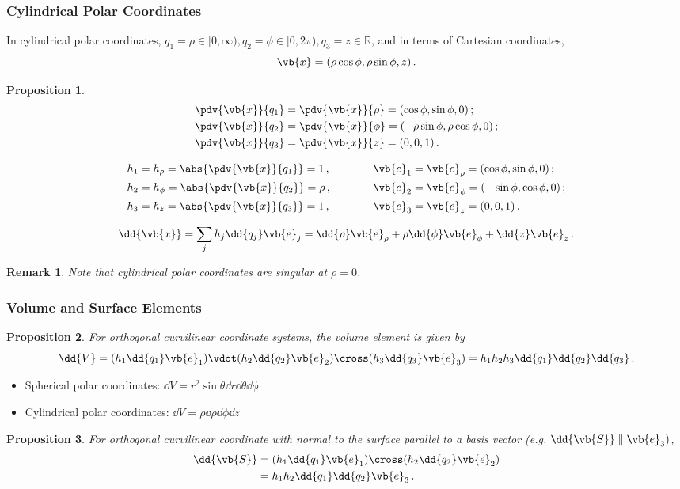 \documentclass{article}
\theoremstyle{plain}\theoremheaderfont{\normalfont\itshape}\theorembodyfont{\rmfamily}\theoremseparator{.}\newtheorem*{rem}{Remark}\newtheorem*{ex}{Example}\newtheorem*{proof}{Proof}\newtheorem*{altp}{Alternative proof}
\theoremstyle{plain}\theoremheaderfont{\normalfont\bfseries}\theorembodyfont{\rmfamily}\theoremseparator{.}\newtheorem{thm}{Theorem}[section]\newtheorem{lem}[thm]{Lemma}\newtheorem{prop}[thm]{Proposition}\newtheorem*{cor}{Corollary}\newtheorem{defn}[thm]{Definition}\newtheorem{clm}[thm]{Claim}\newtheorem{clminproof}{Claim}
\theoremstyle{break}\theoremheaderfont{\normalfont\itshape}\theorembodyfont{\rmfamily}\theoremseparator{.\medskip}\newtheorem*{proofskip}{Proof}\newtheorem*{exs}{Examples}\newtheorem*{rems}{Remarks}
\theoremstyle{break}\theoremheaderfont{\normalfont\bfseries}\theorembodyfont{\rmfamily}\theoremseparator{.\medskip}\newtheorem{lemskip}[thm]{Lemma}\newtheorem{defnskip}[thm]{Definition}\newtheorem{propskip}[thm]{Proposition}\newtheorem{thmskip}[thm]{Theorem}
\numberwithin{equation}{section}
\begin{document}
	\subsubsection{Cylindrical Polar Coordinates}
	In cylindrical polar coordinates, \(q_1=\rho\in[0,\infty), q_2=\phi\in[0,2\pi), q_3=z\in\mathbb{R}\), and in terms of Cartesian coordinates,
	\[\vb{x}=(\rho\cos\phi,\rho\sin\phi,z)\,.\]
	\begin{prop}
		\begin{align*}
			&\pdv{\vb{x}}{q_1}=\pdv{\vb{x}}{\rho}=(\cos\phi,\sin\phi,0)\,;\\
			&\pdv{\vb{x}}{q_2}=\pdv{\vb{x}}{\phi}=(-\rho\sin\phi,\rho\cos\phi,0)\,;\\
			&\pdv{\vb{x}}{q_3}=\pdv{\vb{x}}{z}=(0,0,1)\,.
		\end{align*}
		
		\begin{align*}
			&h_1=h_\rho=\abs{\pdv{\vb{x}}{q_1}}=1\,,\qquad\quad &\vb{e}_1&=\vb{e}_\rho=(\cos\phi,\sin\phi,0)\,;\\
			&h_2=h_\phi=\abs{\pdv{\vb{x}}{q_2}}=\rho\,, &\vb{e}_2&=\vb{e}_\phi=(-\sin\phi,\cos\phi,0)\,;\\
			&h_3=h_z=\abs{\pdv{\vb{x}}{q_3}}=1\,, &\vb{e}_3&=\vb{e}_z=(0,0,1)\,.
		\end{align*}
		
		\[\dd{\vb{x}}=\sum_j h_j\dd{q_j}\vb{e}_j=\dd{\rho}\vb{e}_\rho+\rho\dd{\phi}\vb{e}_\phi+\dd{z}\vb{e}_z\,.\]
	\end{prop}
	\begin{rem}
		Note that cylindrical polar coordinates are singular at \(\rho=0\).
	\end{rem}
	
	\subsubsection{Volume and Surface Elements}
	\begin{prop}
		For orthogonal curvilinear coordinate systems, the volume element is given by
		\[\dd{V}=(h_1\dd{q_1}\vb{e}_1)\vdot(h_2\dd{q_2}\vb{e}_2)\cross(h_3\dd{q_3}\vb{e}_3)=h_1h_2h_3\dd{q_1}\dd{q_2}\dd{q_3}\,.\]
	\end{prop}
	\begin{itemize}[topsep=0pt,leftmargin=50pt]
		\item Spherical polar coordinates: \(\dd{V}=r^2\sin\theta\dd{r}\dd{\theta}\dd{\phi}\)
		\item Cylindrical polar coordinates: \(\dd{V}=\rho\dd{\rho}\dd{\phi}\dd{z}\)
	\end{itemize}
	\begin{prop}
		For orthogonal curvilinear coordinate with normal to the surface parallel to a basis vector (e.g. \(\dd{\vb{S}}\parallel\vb{e}_3)\),
		\begin{align*}
			\dd{\vb{S}}&=(h_1\dd{q_1}\vb{e}_1)\cross(h_2\dd{q_2}\vb{e}_2)\\
			&=h_1h_2\dd{q_1}\dd{q_2}\vb{e}_3\,.
		\end{align*}
	\end{prop}
	
\end{document}
